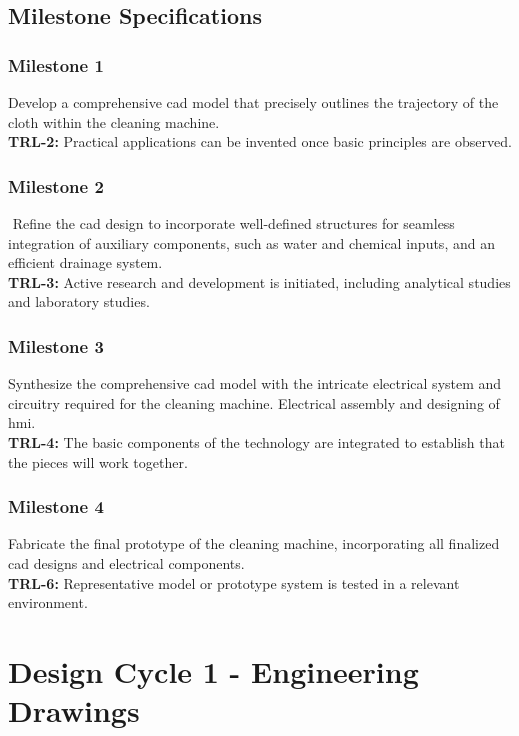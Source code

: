 \documentclass[12pt]{article} %
\begin{document}
\subsection{Milestone Specifications} 
    \subsubsection{Milestone 1} Develop a comprehensive \gls{cad} model that precisely outlines the trajectory of the cloth within the cleaning machine. \\ 
    \textbf{\acrshort{TRL}-2:} Practical applications can be invented once basic principles are observed.
    \subsubsection{Milestone 2}⁠ Refine the \acrshort{cad} design to incorporate well-defined structures for seamless integration of auxiliary components, such as water and chemical inputs, and an efficient drainage system. \\ 
    \textbf{\acrshort{TRL}-3:} Active research and development is initiated, including analytical studies and laboratory studies.
    \subsubsection{Milestone 3} Synthesize the comprehensive \acrshort{cad} model with the intricate electrical system and circuitry required for the cleaning machine. Electrical assembly and designing of \acrshort{hmi}. \\ 
    \textbf{\acrshort{TRL}-4:} The basic components of the technology are integrated to establish that the pieces will work together.
    \subsubsection{Milestone 4} Fabricate the final prototype of the cleaning machine, incorporating all finalized \acrshort{cad} designs and electrical components.\\ 
    \textbf{\acrshort{TRL}-6:} Representative model or prototype system is tested in a relevant environment.

\clearpage
\section{Design Cycle 1 - Engineering Drawings}
\end{document}
